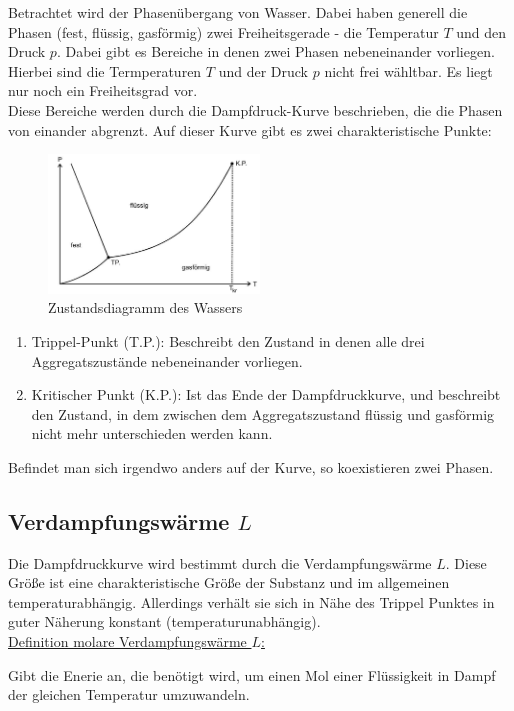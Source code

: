 Betrachtet wird der Phasenübergang von Wasser.
Dabei haben generell die Phasen (fest, flüssig, gasförmig) zwei Freiheitsgerade - die Temperatur $T$ und den Druck $p$.
Dabei gibt es Bereiche in denen zwei Phasen nebeneinander vorliegen. Hierbei sind die Termperaturen $T$ und der Druck $p$
nicht frei wähltbar. Es liegt nur noch ein Freiheitsgrad vor.\\
Diese Bereiche werden durch die Dampfdruck-Kurve beschrieben, die die Phasen von einander abgrenzt.
Auf dieser Kurve gibt es zwei charakteristische Punkte:
\begin{figure}
    \centering
    \includegraphics[width=0.5\textwidth]{bilder/zustandsdiagramm.jpg}
    \caption{Zustandsdiagramm des Wassers \cite[176]{Anleitung}}
    \label{fig:diagramm}
\end{figure}
\newpage
\begin{enumerate}
    \item Trippel-Punkt (T.P.): Beschreibt den Zustand in denen alle drei Aggregatszustände nebeneinander vorliegen.
    \item Kritischer Punkt (K.P.): Ist das Ende der Dampfdruckkurve, und beschreibt den Zustand, in dem
        zwischen dem Aggregatszustand flüssig und gasförmig nicht mehr unterschieden werden kann.
\end{enumerate}
Befindet man sich irgendwo anders auf der Kurve, so koexistieren zwei Phasen.
\subsection{Verdampfungswärme $L$}
Die Dampfdruckkurve wird bestimmt durch die Verdampfungswärme $L$.
Diese Größe ist eine charakteristische Größe der Substanz und im allgemeinen temperaturabhängig.
Allerdings verhält sie sich in Nähe des Trippel Punktes in guter Näherung konstant (temperaturunabhängig).\\\newline
\uline{Definition molare Verdampfungswärme $L$:}
\begin{flushleft}
Gibt die Enerie an, die benötigt wird, um einen Mol einer Flüssigkeit in Dampf
der gleichen Temperatur umzuwandeln.
\end{flushleft}


